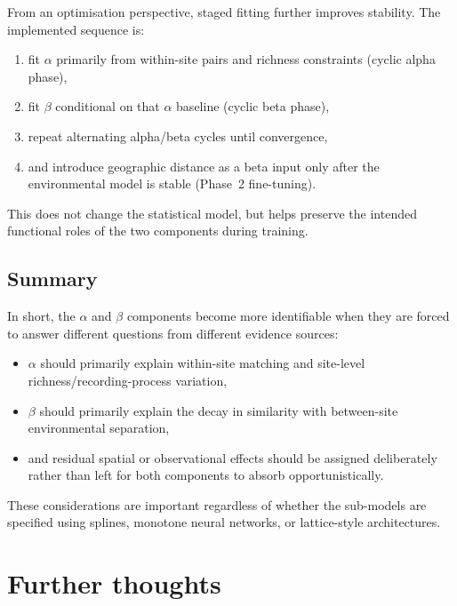 \documentclass{article}
\begin{document}
From an optimisation perspective, staged fitting further improves stability. The implemented sequence is:
\begin{enumerate}
    \item fit $\alpha$ primarily from within-site pairs and richness constraints (cyclic alpha phase),
    \item fit $\beta$ conditional on that $\alpha$ baseline (cyclic beta phase),
    \item repeat alternating alpha/beta cycles until convergence,
    \item and introduce geographic distance as a beta input only after the environmental model is stable (Phase~2 fine-tuning).
\end{enumerate}
This does not change the statistical model, but helps preserve the intended functional roles of the two components during training.

\subsection{Summary}

In short, the \(\alpha\) and \(\beta\) components become more identifiable when they are forced to answer different questions from different evidence sources:
\begin{itemize}
    \item \(\alpha\) should primarily explain within-site matching and site-level richness/recording-process variation,
    \item \(\beta\) should primarily explain the decay in similarity with between-site environmental separation,
    \item and residual spatial or observational effects should be assigned deliberately rather than left for both components to absorb opportunistically.
\end{itemize}
These considerations are important regardless of whether the sub-models are specified using splines, monotone neural networks, or lattice-style architectures.

\section{Further thoughts}
\end{document}
